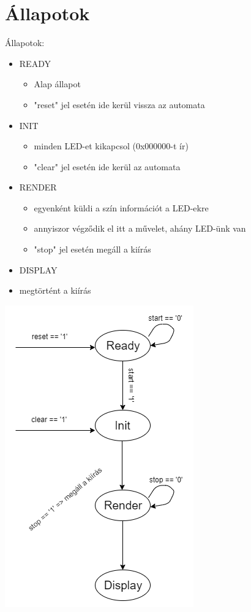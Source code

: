 \documentclass[10pt]{article} %
\begin{document}
\section{Állapotok}

Állapotok:
\begin{itemize}
\item READY
	\begin{itemize}
	\item Alap állapot 
	\item "reset" jel esetén ide kerül vissza az automata
	\end{itemize}
\item INIT
	\begin{itemize}
	\item minden LED-et kikapcsol (0x000000-t ír)
	\item "clear" jel esetén ide kerül az automata
	\end{itemize}
\item RENDER
	\begin{itemize}
	\item egyenként küldi a szín információt a LED-ekre
	\item annyiszor végződik el itt a művelet, ahány LED-ünk van
	\item "stop" jel esetén megáll a kiírás
	\end{itemize}
\item DISPLAY
	\item megtörtént a kiírás
\end{itemize}

\includegraphics[scale=0.5]{allapotdiagram.png}
\end{document}

